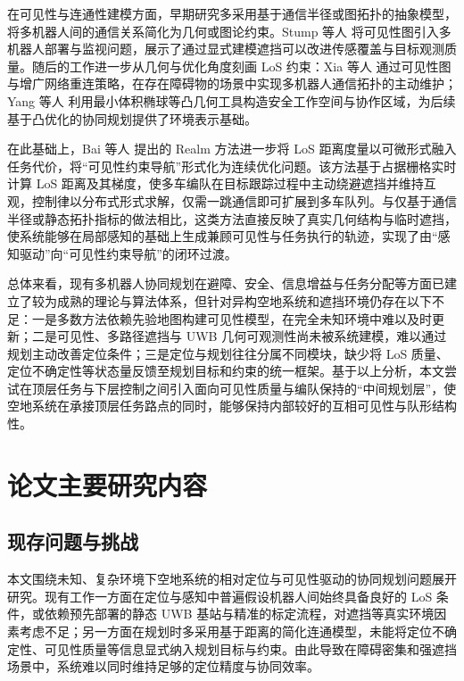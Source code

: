在可见性与连通性建模方面，早期研究多采用基于通信半径或图拓扑的抽象模型，将多机器人间的通信关系简化为几何或图论约束\cite{communication1,communication2,communication3,communication4}。Stump 等人\cite{stump2011visibility} 将可见性图引入多机器人部署与监视问题，展示了通过显式建模遮挡可以改进传感覆盖与目标观测质量。随后的工作进一步从几何与优化角度刻画 LoS 约束：Xia 等人\cite{xia2023relink} 通过可见性图与增广网络重连策略，在存在障碍物的场景中实现多机器人通信拓扑的主动维护；Yang 等人\cite{yang2023mvee} 利用最小体积椭球等凸几何工具构造安全工作空间与协作区域，为后续基于凸优化的协同规划提供了环境表示基础。

在此基础上，Bai 等人\cite{bai2025realm} 提出的 Realm 方法进一步将 LoS 距离度量以可微形式融入任务代价，将“可见性约束导航”形式化为连续优化问题。该方法基于占据栅格实时计算 LoS 距离及其梯度，使多车编队在目标跟踪过程中主动绕避遮挡并维持互观，控制律以分布式形式求解，仅需一跳通信即可扩展到多车队列。与仅基于通信半径或静态拓扑指标的做法相比，这类方法直接反映了真实几何结构与临时遮挡，使系统能够在局部感知的基础上生成兼顾可见性与任务执行的轨迹，实现了由“感知驱动”向“可见性约束导航”的闭环过渡。

总体来看，现有多机器人协同规划在避障、安全、信息增益与任务分配等方面已建立了较为成熟的理论与算法体系，但针对异构空地系统和遮挡环境仍存在以下不足：一是多数方法依赖先验地图构建可见性模型，在完全未知环境中难以及时更新；二是可见性、多路径遮挡与 UWB 几何可观测性尚未被系统建模，难以通过规划主动改善定位条件；三是定位与规划往往分属不同模块，缺少将 LoS 质量、定位不确定性等状态量反馈至规划目标和约束的统一框架。基于以上分析，本文尝试在顶层任务与下层控制之间引入面向可见性质量与编队保持的“中间规划层”，使空地系统在承接顶层任务路点的同时，能够保持内部较好的互相可见性与队形结构性。

\section{论文主要研究内容}

\subsection{现存问题与挑战}

本文围绕未知、复杂环境下空地系统的相对定位与可见性驱动的协同规划问题展开研究。现有工作一方面在定位与感知中普遍假设机器人间始终具备良好的 LoS 条件，或依赖预先部署的静态 UWB 基站与精准的标定流程，对遮挡等真实环境因素考虑不足；另一方面在规划时多采用基于距离的简化连通模型，未能将定位不确定性、可见性质量等信息显式纳入规划目标与约束。由此导致在障碍密集和强遮挡场景中，系统难以同时维持足够的定位精度与协同效率。

